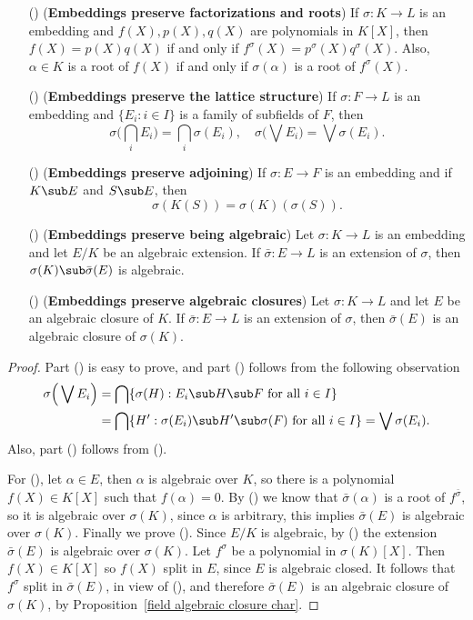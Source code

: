 \begin{proposition}\label{field embedding prop}
\mbox{}
\begin{itemize}
\item[(\rmnum{1})] (\textbf{Embeddings preserve factorizations and roots}) If $\sigma:K\to L$ is an embedding and $f(X),p(X),q(X)$ are polynomials in $K[X]$, then $f(X)=p(X)q(X)$ if and only if $f^\sigma(X)=p^\sigma(X)q^\sigma(X)$. Also, $\alpha\in K$ is a root of $f(X)$ if and only if $\sigma(\alpha)$ is a root of $f^\sigma(X)$.
\item[(\rmnum{2})] (\textbf{Embeddings preserve the lattice structure}) If $\sigma:F\to L$ is an embedding and $\{E_i:i\in I\}$ is a family of subfields of $F$, then
\[\sigma\Big(\bigcap_iE_i\Big)=\bigcap_i\sigma(E_i),\quad \sigma\Big(\bigvee E_i\Big)=\bigvee\sigma(E_i).\] 
\item[(\rmnum{3})] (\textbf{Embeddings preserve adjoining}) If $\sigma:E\to F$ is an embedding and if $K\sub E$ and $S\sub E$, then
\[\sigma(K(S))=\sigma(K)(\sigma(S)).\] 
\item[(\rmnum{4})] (\textbf{Embeddings preserve being algebraic}) Let $\sigma:K\to L$ is an embedding and let $E/K$ be an algebraic extension. If $\bar{\sigma}:E\to L$ is an extension of $\sigma$, then $\sigma(K)\sub\bar{\sigma}(E)$ is algebraic.
\item[(\rmnum{5})] (\textbf{Embeddings preserve algebraic closures}) Let $\sigma:K\to L$ and let $E$ be an algebraic closure of $K$. If $\bar{\sigma}:E\to L$ is an extension of $\sigma$, then $\bar{\sigma}(E)$ is an algebraic closure of $\sigma(K)$.  
\end{itemize}
\end{proposition}
\begin{proof}
Part () is easy to prove, and part () follows from the following observation
\begin{align*}
\sigma\Big(\bigvee E_i\Big)&=\bigcap\{\sigma(H):E_i\sub H\sub F\text{ for all $i\in I$}\}\\
&=\bigcap\{H':\sigma(E_i)\sub H'\sub\sigma(F)\text{ for all $i\in I$}\}=\bigvee\sigma(E_i).
\end{align*}
Also, part () follows from ().\par
For (), let $\alpha\in E$, then $\alpha$ is algebraic over $K$, so there is a polynomial $f(X)\in K[X]$ such that $f(\alpha)=0$. By () we know that $\bar{\sigma}(\alpha)$ is a root of $f^{\bar{\sigma}}$, so it is algebraic over $\sigma(K)$, since $\alpha$ is arbitrary, this implies $\bar{\sigma}(E)$ is algebraic over $\sigma(K)$. Finally we prove (). Since $E/K$ is algebraic, by () the extension $\bar{\sigma}(E)$ is algebraic over $\sigma(K)$. Let $f^\sigma$ be a polynomial in $\sigma(K)[X]$. Then $f(X)\in K[X]$ so $f(X)$ split in $E$, since $E$ is algebraic closed. It follows that $f^\sigma$ split in $\bar{\sigma}(E)$, in view of (), and therefore $\bar{\sigma}(E)$ is an algebraic closure of $\sigma(K)$, by Proposition~\ref{field algebraic closure char}. 
\end{proof}
